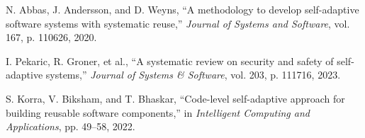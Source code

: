 \documentclass[a4paper,10pt]{article}
\begin{document}
\begin{thebibliography}{9}


N. Abbas, J. Andersson, and D. Weyns, ``A methodology to develop self-adaptive software systems with systematic reuse,'' \emph{Journal of Systems and Software}, vol. 167, p. 110626, 2020.

I. Pekaric, R. Groner, et al., ``A systematic review on security and safety of self-adaptive systems,'' \emph{Journal of Systems \& Software}, vol. 203, p. 111716, 2023.

S. Korra, V. Biksham, and T. Bhaskar, ``Code-level self-adaptive approach for building reusable software components,'' in \emph{Intelligent Computing and Applications}, pp. 49--58, 2022.
\end{thebibliography}
\end{document}

